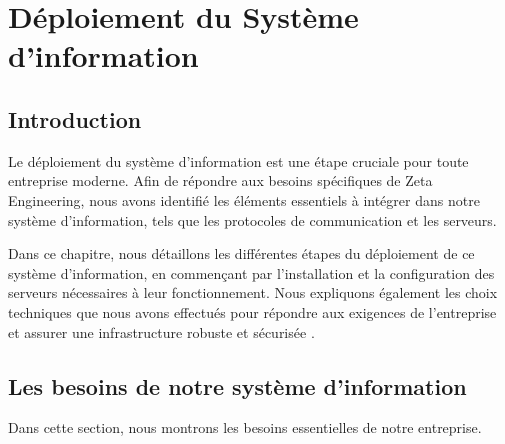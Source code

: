 \chapter{Déploiement du Système d'information}


\section{Introduction}


Le déploiement du système d'information est une étape cruciale pour toute entreprise moderne. Afin de répondre aux besoins spécifiques de Zeta Engineering, nous avons identifié les éléments essentiels à intégrer dans notre système d'information, tels que les protocoles de communication et les serveurs. 


Dans ce chapitre, nous détaillons les différentes étapes du déploiement de ce système d'information, en commençant par l'installation et la configuration des serveurs nécessaires à leur fonctionnement. Nous expliquons également les choix techniques que nous avons effectués pour répondre aux exigences de l'entreprise et assurer une infrastructure robuste et sécurisée \cite{opg}.


\section{Les besoins de notre système d'information}



Dans cette section, nous montrons les besoins essentielles de notre entreprise.



